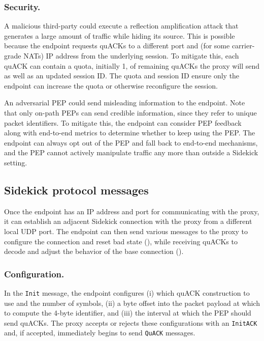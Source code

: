 \subsubsection{Security.}
A malicious third-party could execute a reflection amplification attack that
generates a large amount of traffic while hiding its source. This is
possible because the endpoint requests quACKs to a different port and (for some
carrier-grade NATs) IP address from the underlying session. To mitigate this,
each quACK can contain a quota, initially 1, of remaining quACKs the proxy
will send as well as an updated session ID\@.
The quota and session ID ensure only the endpoint can increase the quota or
otherwise reconfigure the session.

An adversarial PEP could send misleading information to the endpoint. Note that
only on-path PEPs can send credible information, since they refer to unique
packet identifiers.
To mitigate this, the endpoint can consider PEP feedback along with
end-to-end metrics to determine whether to keep using the PEP. The endpoint can
always opt out of the PEP and fall back to end-to-end mechanisms, and the PEP cannot actively manipulate traffic any
more than outside a Sidekick setting.


\subsection{Sidekick protocol messages}
\label{sec:sidekick:design:messages}



Once the endpoint has an IP address and port for communicating with the proxy, it
can establish an adjacent Sidekick connection with the proxy from a different
local UDP port. The endpoint can then send various messages to the proxy to
configure the connection and reset bad state (),
while receiving quACKs to decode and adjust the behavior of the base connection
().

\subsubsection{Configuration.}
In the \texttt{Init} message, the endpoint configures (i) which quACK construction
to use and the number of symbols, (ii) a byte offset into the packet payload at
which to compute the 4-byte identifier, and (iii) the interval at which the PEP
should send quACKs.
The proxy accepts or rejects these configurations with an \texttt{InitACK}
and, if accepted, immediately begins to send \texttt{QuACK} messages.

